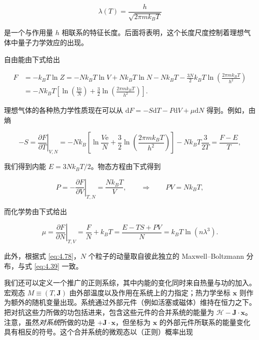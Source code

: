 \begin{equation}\label{eq:4.80}
  \lambda(T)=\frac{h}{\sqrt{2\pi mk_BT}}
\end{equation}

是一个与作用量 $h$ 相联系的特征长度。后面将表明，这个长度尺度控制着理想气体中量子力学效应的出现。

自由能由下式给出

\begin{equation}\label{eq:4.81}
  \begin{aligned}
    F&=-k_BT\ln Z=-Nk_BT\ln V+Nk_BT\ln N-Nk_BT-\frac{3N}{2}k_BT\ln\left(\frac{2\pi mk_BT}{h^2}\right)\\
    &=-Nk_BT\left[\ln\left(\frac{V\mathrm{e}}{N}\right)+\frac{3}{2}\ln\left(\frac{2\pi mk_BT}{h^2}\right)\right].
  \end{aligned}
\end{equation}

理想气体的各种热力学性质现在可以从 $\mathrm{d}F=-S\mathrm{d}T-P\mathrm{d}V+\mu\mathrm{d}N$ 得到。例如，由熵

\begin{equation}\label{eq:4.82}
  -S=\left.\frac{\partial F}{\partial T}\right|_{V,N}=-Nk_B\left[\ln\frac{V\mathrm{e}}{N}+\frac{3}{2}\ln\left(\frac{2\pi mk_BT}{h^2}\right)\right]-Nk_BT\frac{3}{2T}=\frac{F-E}{T},
\end{equation}

我们得到内能 $E=3Nk_BT/2$。物态方程由下式得到

\begin{equation}\label{eq:4.83}
  P=-\left.\frac{\partial F}{\partial V}\right|_{T,N}=\frac{Nk_BT}{V},\qquad\Longrightarrow\qquad PV=Nk_BT,
\end{equation}

而化学势由下式给出

\begin{equation}\label{eq:4.84}
  \mu=\left.\frac{\partial F}{\partial N}\right|_{T,V}=\frac{F}{N}+k_BT=\frac{E-TS+PV}{N}=k_BT\ln\left(n\lambda^3\right).
\end{equation}

此外，根据式 \eqref{eq:4.78}，$N$ 个粒子的动量取自彼此独立的 Maxwell--Boltzmann 分布，与式 \eqref{eq:4.39} 一致。


我们还可以定义一个推广的正则系综，其中内能的变化同时来自热量与功的加入。宏观态 $M\equiv(T,\mathbf J)$ 由外部温度以及作用在系统上的力指定；热力学坐标 $\mathbf x$ 则作为额外的随机变量出现。系统通过外部元件（例如活塞或磁体）维持在恒力之下。把对抗这些力所做的功包括进来，包含这些元件的合并系统的能量为 $\mathscr H-\mathbf J\cdot\mathbf x$。注意，虽然\emph{对系统}所做的功是 $+\mathbf J\cdot\mathbf x$，但坐标为 $\mathbf x$ 的外部元件所联系的能量变化具有相反的符号。这个合并系统的微观态以（正则）概率出现

